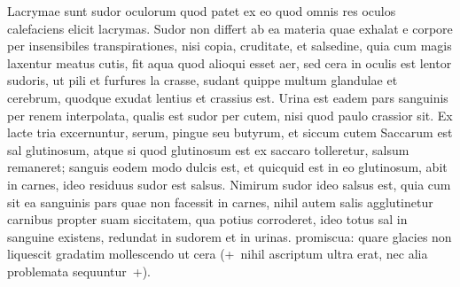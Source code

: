 \pend%
\count{}
\pstart%
\pend%
\pstart%
Lacrymae sunt sudor oculorum quod patet ex eo quod omnis res oculos calefaciens elicit lacrymas.
\pend%
\pstart%
Sudor non differt ab ea materia quae exhalat e corpore per insensibiles transpirationes, nisi copia, cruditate, et salsedine, quia cum magis laxentur meatus cutis, fit aqua quod alioqui esset aer, sed cera in oculis est lentor sudoris, ut pili et furfures la crasse, sudant quippe multum glandulae et cerebrum, quodque exudat lentius et crassius est. Urina est eadem pars sanguinis per renem interpolata, qualis est sudor per cutem, nisi quod paulo crassior sit. Ex lacte tria excernuntur, serum, pingue seu butyrum, et siccum cutem
\pend%
\pstart%
Saccarum est sal glutinosum, atque si quod glutinosum est ex saccaro tolleretur, salsum remaneret; sanguis eodem modo dulcis est, et quicquid est in eo glutinosum, abit in carnes, ideo residuus sudor est salsus. Nimirum sudor ideo salsus est, quia cum sit ea sanguinis pars quae non facessit in carnes, nihil autem salis agglutinetur carnibus propter suam siccitatem, qua potius
corroderet, ideo totus sal in sanguine existens, redundat in sudorem et in urinas.
\pend%
\pstart%
promiscua: quare glacies non liquescit gradatim mollescendo ut cera (+~nihil ascriptum ultra erat, nec alia problemata sequuntur~+).
\pend%
\count{}
\count{}
\count{}

